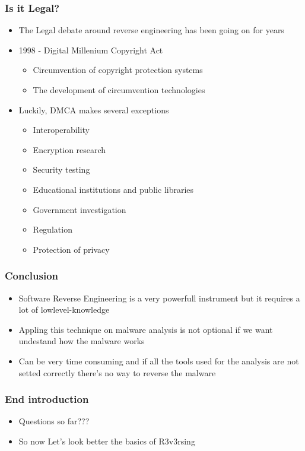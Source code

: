 \documentclass[]{beamer}
\begin{document}
		\begin{frame}
			\frametitle{Is it Legal?}
			\begin{itemize}
				\item{The Legal debate around reverse engineering has been going on for years}
				\item{1998 -  Digital Millenium Copyright Act}
					\begin{itemize}
						\item{Circumvention of copyright protection systems}
						\item{The development of circumvention technologies}
					\end{itemize}
				\item{Luckily, DMCA makes several exceptions}
					\begin{itemize}
						\item{Interoperability}
						\item{Encryption research}
						\item{Security testing}
						\item{Educational institutions and public libraries}
						\item{Government investigation}
						\item{Regulation}
						\item{Protection of privacy}
					\end{itemize}
			\end{itemize}
		\end{frame}
	 	\begin{frame}
			\frametitle{Conclusion}
			\begin{itemize}
				\item{Software Reverse Engineering is a very powerfull instrument but it requires a lot of lowlevel-knowledge }
				\item{Appling this technique on malware analysis is not optional if we want undestand how the malware works}
				\item{Can be very time consuming and if all the tools used for the analysis are not setted correctly there's no way to reverse the malware }
			\end{itemize}
		\end{frame}
		\begin{frame}
			\frametitle{End introduction}
			\begin{itemize}
				\item{Questions so far???}
				\item{So now Let's look better the basics of R3v3rsing}
			\end{itemize}
		\end{frame}
\end{document}
